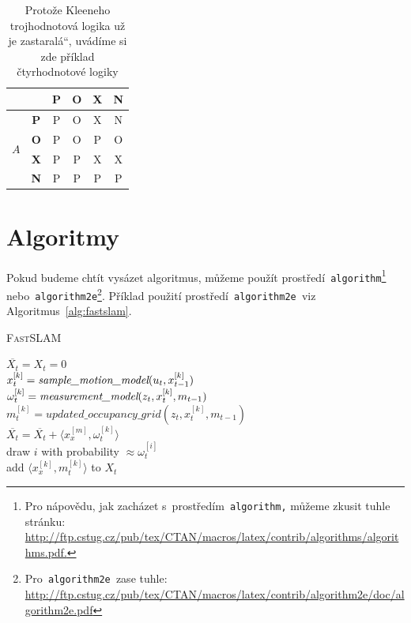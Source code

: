 \documentclass[a4paper, 11pt]{article}
\providecommand{\uv}[1]{\quotedblbase#1\textquotedblleft}
\begin{document}
\begin{table}[ht]
\begin{tabular}{|c|c|c|c|c|c|}
        \multicolumn{2}{|c|}{} & \textbf{P} & \textbf{O} & \textbf{X} & \textbf{N} \\
        \hline
        \multirow{4}{*}{$A$} & \textbf{P} & P & O & X & N \\
        \cline{2-6}
        & \textbf{O} & P & O & P & O \\
        \cline{2-6}
        & \textbf{X} & P & P & X & X \\
        \cline{2-6}
        & \textbf{N} & P & P & P & P \\
        \hline
    \end{tabular}
    \caption{Protože Kleeneho trojhodnotová logika už je \uv{zastaralá}, uvádíme si zde příklad čtyrhodnotové logiky}
    \label{tab:logic}
\end{table}
\bigskip
\pagebreak

\section{Algoritmy}\label{alg}

Pokud budeme chtít vysázet algoritmus, můžeme použít prostředí\verb| algorithm|\footnote{Pro nápovědu, jak zacházet s~prostředím\texttt{ algorithm,} můžeme zkusit tuhle stránku:\\ \href{http://ftp.cstug.cz/pub/tex/CTAN/macros/latex/contrib/algorithms/algorithms.pdf.}{http://ftp.cstug.cz/pub/tex/CTAN/macros/latex/contrib/algorithms/algorithms.pdf.}}\verb| | nebo\verb| algorithm2e|\footnote{Pro\texttt{ algorithm2e }zase tuhle: \href{http://ftp.cstug.cz/pub/tex/CTAN/macros/latex/contrib/algorithm2e/doc/algorithm2e.pdf}{http://ftp.cstug.cz/pub/tex/CTAN/macros/latex/contrib/algorithm2e/doc/algorithm2e.pdf}}.
Příklad použití prostředí\verb| algorithm2e |viz Algoritmus~\ref{alg:fastslam}.
\bigskip

\begin{algorithm}[h]
    \label{alg:fastslam}
    \caption{\textsc{FastSLAM}}
    \SetNlSty{}{}{:}
    \SetNlSkip{-12pt}
    \SetAlgoNoLine
    \BlankLine
    \Indpp\Indp $\overline{X_t} = X_t = 0$ \\
     {\Indpp
        $x_t^{[k]} = \emph{sample\_motion\_model}(u_t, x_{t-1}^{[k]})$ \\
        $\omega_t^{[k]} = \emph{measurement\_model}(z_t, x_t^{[k]}, m_{t-1})$ \\
        $m_t^{[k]} = updated\_occupancy\_grid(z_t, x_t^{[k]}, m_{t-1})$ \\
        $\overline{X_t} = \overline{X_t} + \langle x_x^{[m]}, \omega_t^{[k]} \rangle$ \\
    }
     {\Indpp
        draw $i$ with probability $\approx \omega_t^{[i]}$ \\
        add $\langle x_x^{[k]}, m_t^{[k]} \rangle$ to $X_t$ \\
    }
\end{algorithm}
\end{document}
